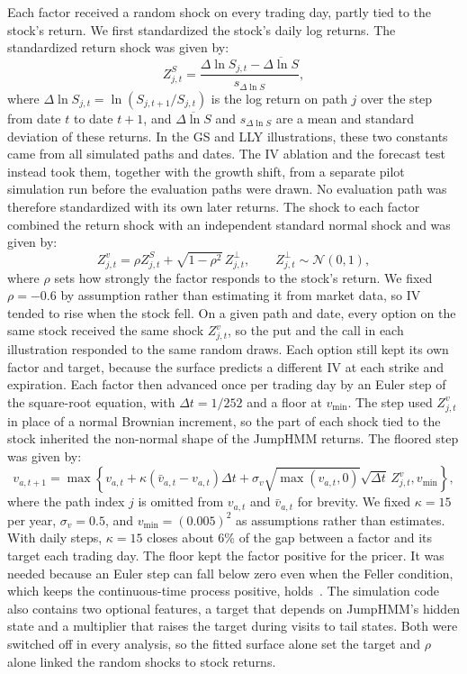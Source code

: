 Each factor received a random shock on every trading day, partly tied to the stock's return. We first standardized the stock's daily log returns. The standardized return shock was given by:
\begin{equation}\label{eq:return_shock}
    Z^S_{j,t}=\frac{\Delta\ln S_{j,t}-\overline{\Delta\ln S}}
    {s_{\Delta\ln S}},
\end{equation}
where $\Delta\ln S_{j,t}=\ln(S_{j,t+1}/S_{j,t})$ is the log return on path $j$ over the step from date $t$ to date $t+1$, and $\overline{\Delta\ln S}$ and $s_{\Delta\ln S}$ are a mean and standard deviation of these returns. In the GS and LLY illustrations, these two constants came from all simulated paths and dates. The IV ablation and the forecast test instead took them, together with the growth shift, from a separate pilot simulation run before the evaluation paths were drawn. No evaluation path was therefore standardized with its own later returns. The shock to each factor combined the return shock with an independent standard normal shock and was given by:
\begin{equation}\label{eq:variance_shock}
    Z^v_{j,t}=\rho Z^S_{j,t}+\sqrt{1-\rho^2}\,Z^{\perp}_{j,t},
    \qquad Z^{\perp}_{j,t}\sim\mathcal N(0,1),
\end{equation}
where $\rho$ sets how strongly the factor responds to the stock's return. We fixed $\rho=-0.6$ by assumption rather than estimating it from market data, so IV tended to rise when the stock fell. On a given path and date, every option on the same stock received the same shock $Z^v_{j,t}$, so the put and the call in each illustration responded to the same random draws. Each option still kept its own factor and target, because the surface predicts a different IV at each strike and expiration. Each factor then advanced once per trading day by an Euler step of the square-root equation, with $\Delta t=1/252$ and a floor at $v_{\min}$. The step used $Z^v_{j,t}$ in place of a normal Brownian increment, so the part of each shock tied to the stock inherited the non-normal shape of the JumpHMM returns. The floored step was given by:
\begin{equation}\label{eq:euler}
 v_{a,t+1}=\max\!\left\{
 v_{a,t}+\kappa(\bar v_{a,t}-v_{a,t})\Delta t
 +\sigma_v\sqrt{\max(v_{a,t},0)}\sqrt{\Delta t}\,Z^v_{j,t},
 v_{\min}\right\},
\end{equation}
where the path index $j$ is omitted from $v_{a,t}$ and $\bar v_{a,t}$ for brevity. We fixed $\kappa=15$ per year, $\sigma_v=0.5$, and $v_{\min}=(0.005)^2$ as assumptions rather than estimates. With daily steps, $\kappa=15$ closes about 6\% of the gap between a factor and its target each trading day. The floor kept the factor positive for the pricer. It was needed because an Euler step can fall below zero even when the Feller condition, which keeps the continuous-time process positive, holds~\cite{andersen2008}. The simulation code also contains two optional features, a target that depends on JumpHMM's hidden state and a multiplier that raises the target during visits to tail states. Both were switched off in every analysis, so the fitted surface alone set the target and $\rho$ alone linked the random shocks to stock returns.

